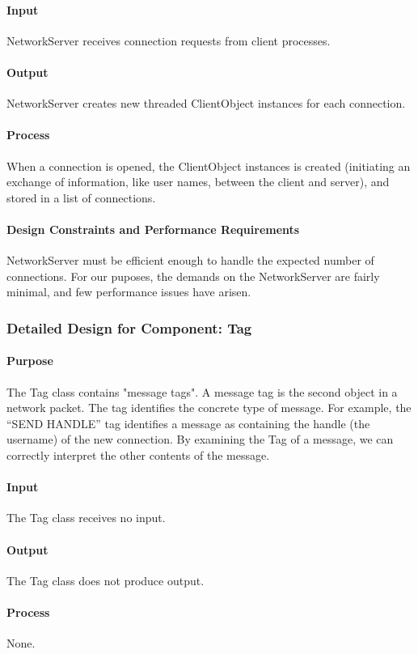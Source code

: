 \documentclass[12pt,a4paper,titlepage]{article}
\begin{document}
\paragraph{Input} NetworkServer receives connection requests from client processes.
\paragraph{Output} NetworkServer creates new threaded ClientObject instances for each connection.
\paragraph{Process} When a connection is opened, the ClientObject instances is created (initiating an exchange of information, like user names, between the client and server), and stored in a list of connections.
\paragraph{Design Constraints and Performance Requirements} NetworkServer must be efficient enough to handle the expected number of connections. For our puposes, the demands on the NetworkServer are fairly minimal, and few performance issues have arisen.

\subsubsection{Detailed Design for Component: Tag }
\paragraph{Purpose} The Tag class contains "message tags". A message tag is the second object in a network packet. The tag identifies the concrete type of message. For example, the ``SEND HANDLE'' tag identifies a message as containing the handle (the username) of the new connection. By examining the Tag of a message, we can correctly interpret the other contents of the message. 
\paragraph{Input} The Tag class receives no input. 
\paragraph{Output} The Tag class does not produce output. 
\paragraph{Process} None. 
\end{document}
